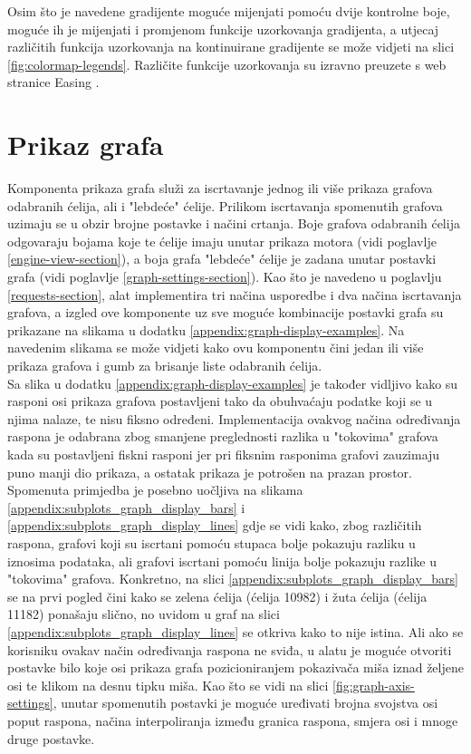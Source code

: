 \documentclass[times, utf8, diplomski]{fer}
\begin{document}
Osim što je navedene gradijente moguće mijenjati pomoću dvije kontrolne boje, moguće ih je mijenjati i promjenom funkcije uzorkovanja gradijenta, a utjecaj različitih funkcija uzorkovanja na kontinuirane gradijente se može vidjeti na slici \ref{fig:colormap-legends}. Različite funkcije uzorkovanja su izravno preuzete s web stranice Easing \citep{easing}.

\section{Prikaz grafa} \label{graph-view-section}

Komponenta prikaza grafa služi za iscrtavanje jednog ili više prikaza grafova odabranih ćelija, ali i "lebdeće" ćelije. Prilikom iscrtavanja spomenutih grafova uzimaju se u obzir brojne postavke i načini crtanja. Boje grafova odabranih ćelija odgovaraju bojama koje te ćelije imaju unutar prikaza motora (vidi poglavlje \ref{engine-view-section}), a boja grafa "lebdeće" ćelije je zadana unutar postavki grafa (vidi poglavlje \ref{graph-settings-section}). Kao što je navedeno u poglavlju \ref{requests-section}, alat implementira tri načina usporedbe i dva načina iscrtavanja grafova, a izgled ove komponente uz sve moguće kombinacije postavki grafa su prikazane na slikama u dodatku \ref{appendix:graph-display-examples}. Na navedenim slikama se može vidjeti kako ovu komponentu čini jedan ili više prikaza grafova i gumb za brisanje liste odabranih ćelija.\\

Sa slika u dodatku \ref{appendix:graph-display-examples} je također vidljivo kako su rasponi osi prikaza grafova postavljeni tako da obuhvaćaju podatke koji se u njima nalaze, te nisu fiksno određeni. Implementacija ovakvog načina određivanja raspona je odabrana zbog smanjene preglednosti razlika u "tokovima" grafova kada su postavljeni fiskni rasponi jer pri fiksnim rasponima grafovi zauzimaju puno manji dio prikaza, a ostatak prikaza je potrošen na prazan prostor. Spomenuta primjedba je posebno uočljiva na slikama \ref{appendix:subplots_graph_display_bars} i \ref{appendix:subplots_graph_display_lines} gdje se vidi kako, zbog različitih raspona, grafovi koji su iscrtani pomoću stupaca bolje pokazuju razliku u iznosima podataka, ali grafovi iscrtani pomoću linija bolje pokazuju razlike u "tokovima" grafova. Konkretno, na slici \ref{appendix:subplots_graph_display_bars} se na prvi pogled čini kako se zelena ćelija (ćelija 10982) i žuta ćelija (ćelija 11182) ponašaju slično, no uvidom u graf na slici \ref{appendix:subplots_graph_display_lines} se otkriva kako to nije istina. Ali ako se korisniku ovakav način određivanja raspona ne sviđa, u alatu je moguće otvoriti postavke bilo koje osi prikaza grafa pozicioniranjem pokazivača miša iznad željene osi te klikom na desnu tipku miša. Kao što se vidi na slici \ref{fig:graph-axis-settings}, unutar spomenutih postavki je moguće uređivati brojna svojstva osi poput raspona, načina interpoliranja između granica raspona, smjera osi i mnoge druge postavke.
\end{document}
